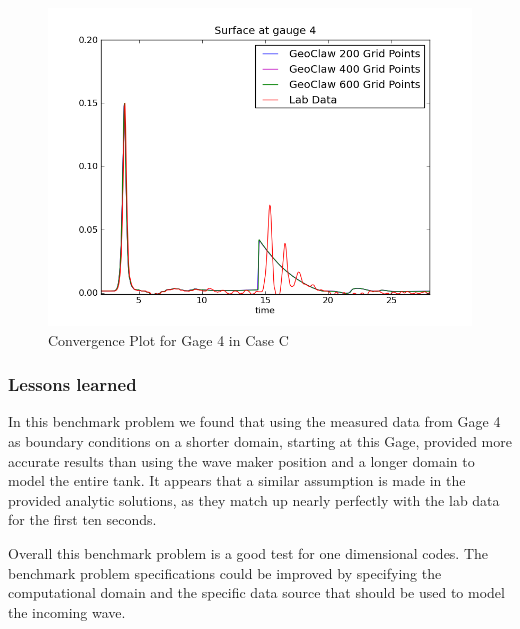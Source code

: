 \begin{figure}[ht]
\hfil\includegraphics[width=5in]{bp5/nonLinearCompare}\hfil
\caption{\label{fig:nonLinearConverge} Convergence Plot for Gage 4 in Case C }
\end{figure}

\subsubsection{Lessons learned}
In this benchmark problem we found that using the measured data from Gage 4 as boundary conditions on a shorter domain, starting at this Gage, provided more accurate results than using the wave maker position and a longer domain to model the entire tank.  It appears that a similar assumption is made in the provided analytic solutions, as they match up nearly perfectly with the lab data for the first ten seconds.  

Overall this benchmark problem is a good test for one dimensional codes.  The benchmark problem specifications could be improved by specifying the computational domain and the specific data source that should be used to model the incoming wave. 
